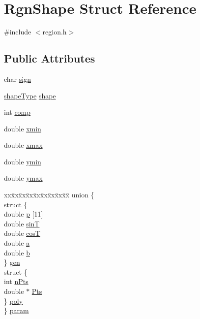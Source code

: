 \hypertarget{struct_rgn_shape}{}\section{Rgn\+Shape Struct Reference}
\label{struct_rgn_shape}


{\ttfamily \#include $<$region.\+h$>$}

\subsection*{Public Attributes}
\begin{DoxyCompactItemize}
\item 
char \hyperlink{struct_rgn_shape_a73cb8b41b5be70908a5ec4829408c943}{sign}
\item 
\hyperlink{region_8h_a358236826a66af885197e3b18d199a8d}{shape\+Type} \hyperlink{struct_rgn_shape_ac31d3f8b498354430b0405bf87f16eb7}{shape}
\item 
int \hyperlink{struct_rgn_shape_af7a321ccad2e23e8f058fc1c53e54c53}{comp}
\item 
double \hyperlink{struct_rgn_shape_aa7f280776cd4196cb08112688ded33fc}{xmin}
\item 
double \hyperlink{struct_rgn_shape_a89de99637820ac43d41ba924b877c0aa}{xmax}
\item 
double \hyperlink{struct_rgn_shape_a54b97535d6c93dd10580ba20bcdba50b}{ymin}
\item 
double \hyperlink{struct_rgn_shape_af377f2e676b334da13dad00e0acf02b5}{ymax}
\item 
\begin{tabbing}
xx\=xx\=xx\=xx\=xx\=xx\=xx\=xx\=xx\=\kill
union \{\\
\>struct \{\\
\>\>double \hyperlink{struct_rgn_shape_ab734e323536da21252c31b96c667f84e}{p} \mbox{[}11\mbox{]}\\
\>\>double \hyperlink{struct_rgn_shape_ac56d16cafa9633a15f88d524673cfd59}{sinT}\\
\>\>double \hyperlink{struct_rgn_shape_a10c7c9d982564f15e52f3c9d1dda5135}{cosT}\\
\>\>double \hyperlink{struct_rgn_shape_a8c593b171578fce0df228af9450a98bb}{a}\\
\>\>double \hyperlink{struct_rgn_shape_a22e2f2dd3309cecc9ebb10c5e9ff8e8b}{b}\\
\>\} \hyperlink{struct_rgn_shape_a413ea3b0064b873b95b39e189bdf2180}{gen}\\
\>struct \{\\
\>\>int \hyperlink{struct_rgn_shape_a18948a87bb209ec27cd064c6d4ffc6c6}{nPts}\\
\>\>double $\ast$ \hyperlink{struct_rgn_shape_a7baba8f4ff0dd0cc21d1950b9d8da7c3}{Pts}\\
\>\} \hyperlink{struct_rgn_shape_a6f39e5eb21e9ceeda533630edf80cc0d}{poly}\\
\} \hyperlink{struct_rgn_shape_a5831bd6f6b156ee95e49d6543ae89fed}{param}\\

\end{tabbing}\end{DoxyCompactItemize}



